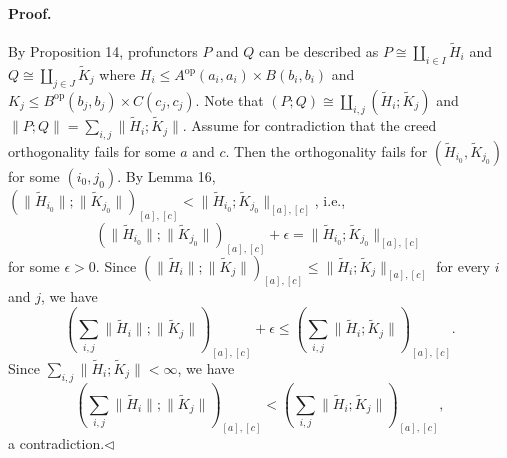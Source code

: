 \documentclass[10pt,a4paper]{article}
\newcommand{\norm}[1]{\lVert#1\rVert}
\begin{document}
\paragraph{Proof.} By Proposition 14, profunctors $P$ and $Q$ can be described as $P\cong\coprod_{i\in I}\widetilde H_i$ and $Q\cong\coprod_{j\in J}\widetilde K_j$ where $H_i\le A^{\mathrm{op}}(a_i,a_i)\times B(b_i,b_i)$ and $K_j\le B^{\mathrm{op}}(b_j,b_j)\times C(c_j,c_j)$. Note that $(P;Q)\cong\coprod_{i,j}(\widetilde H_i;\widetilde K_j)$ and $\norm{P;Q}=\sum_{i,j}\norm{\widetilde H_i;\widetilde K_j}$.
Assume for contradiction that the creed orthogonality fails for some $a$ and $c$. Then the orthogonality fails for $(\widetilde H_{i_0},\widetilde K_{j_0})$ for some $(i_0,j_0)$. By Lemma 16,
$(\norm{\widetilde H_{i_0}};\norm{\widetilde K_{j_0}})_{[a],[c]}<
\norm{\widetilde H_{i_0};\widetilde K_{j_0}}_{[a],[c]}$,
i.e.,
\[
(\norm{\widetilde H_{i_0}};\norm{\widetilde K_{j_0}})_{[a],[c]}+\epsilon
=\norm{\widetilde H_{i_0};\widetilde K_{j_0}}_{[a],[c]}
\]
for some $\epsilon>0$. Since $(\norm{\widetilde H_i};\norm{\widetilde K_j})_{[a],[c]}\le\norm{\widetilde H_i;\widetilde K_j}_{[a],[c]}$ for every $i$ and $j$, we have
\[
\left(\sum_{i,j}\norm{\widetilde H_i};\norm{\widetilde K_j}\right)_{[a],[c]}+\epsilon
\le\left(\sum_{i,j}\norm{\widetilde H_i;\widetilde K_j}\right)_{[a],[c]}.
\]
Since $\sum_{i,j}\norm{\widetilde H_i;\widetilde K_j}<\infty$, we have
\[
\left(\sum_{i,j}\norm{\widetilde H_i};\norm{\widetilde K_j}\right)_{[a],[c]}
<\left(\sum_{i,j}\norm{\widetilde H_i;\widetilde K_j}\right)_{[a],[c]},
\]
a contradiction.\hfill$\triangleleft$
\end{document}
